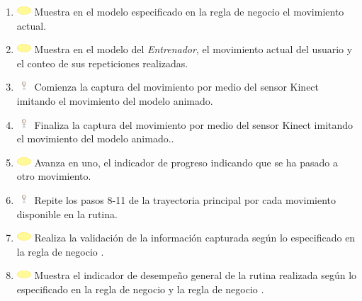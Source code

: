 \begin{enumerate}
	\item \includegraphics[width=15pt]{./Figuras/iconosCU/herramienta.png} Muestra en el modelo especificado en la regla de negocio  el movimiento actual.
	\item \includegraphics[width=15pt]{./Figuras/iconosCU/herramienta.png} Muestra en el modelo del \textit{Entrenador}, el movimiento actual del usuario y el conteo de sus repeticiones realizadas.
	\item \includegraphics[width=15pt, height=10pt]{./Figuras/iconosCU/usuario.png} Comienza la captura del movimiento por medio del sensor Kinect imitando el movimiento del modelo animado.
	\item \includegraphics[width=15pt, height=10pt]{./Figuras/iconosCU/usuario.png} Finaliza la captura del movimiento por medio del sensor Kinect imitando el movimiento del modelo animado..
	\item \includegraphics[width=15pt]{./Figuras/iconosCU/herramienta.png} Avanza en uno, el indicador de progreso indicando que se ha pasado a otro movimiento.
	\item \includegraphics[width=15pt, height=10pt]{./Figuras/iconosCU/usuario.png} Repite los pasos 8-11 de la trayectoria principal por cada movimiento disponible en la rutina.
	\item \includegraphics[width=15pt]{./Figuras/iconosCU/herramienta.png} Realiza la validación de la información capturada según lo especificado en la regla de negocio .
	\item \includegraphics[width=15pt]{./Figuras/iconosCU/herramienta.png} Muestra el indicador de desempeño general de la rutina realizada según lo especificado en la regla de negocio  y la regla de negocio .

\end{enumerate}
